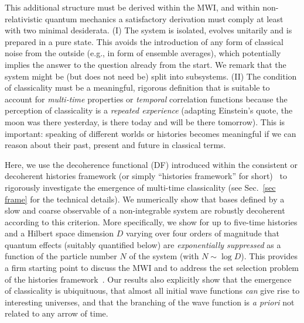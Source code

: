 \documentclass[pre,onecolumn,12pt,aps,longbibliography,nofootinbib]{revtex4-2}
\newcommand{\blue}[1]{#1}
\newcommand{\new}[1]{#1}
\begin{document}
This additional structure must be derived \new{within the MWI}, and within non-relativistic quantum mechanics a satisfactory derivation must comply at least with two minimal desiderata. (I) The system is isolated, evolves unitarily and is prepared in a pure state. This avoids the introduction of any form of classical noise from the outside (e.g., in form of ensemble averages), which potentially implies the answer to the question already from the start. We remark that the system might be (but does not need be) split into subsystems. (II) The condition of classicality must be a meaningful, rigorous definition that is suitable to account for \emph{multi-time} properties or \emph{temporal} correlation functions because the perception of classicality is a \emph{repeated experience} (adapting Einstein's quote, the moon was there yesterday, is there today and will be there tomorrow). This is important: speaking of different worlds or histories becomes meaningful if we can reason about their past, present and future in classical terms.

Here, we use the decoherence functional (DF) introduced within the consistent or decoherent histories framework (or simply ``histories framework'' for short)~\cite{GriffithsJSP1984, GellMannHartleInBook1990, OmnesRMP1992, DowkerHalliwellPRD1992, GellMannHartlePRD1993, HalliwellANY1995, DowkerKentJSP1996, GriffithsBook2002, GellMannHartlePRA2007, Griffiths2019} \new{to} rigorous\new{ly investigate the emergence} of multi-time classicality (see Sec.~\ref{sec frame} for the technical details). We numerically show that bases defined by a slow and coarse observable of a non-integrable system \new{are robustly decoherent according to this criterion}. More specifically, we show for up to five-time histories and a Hilbert space dimension $D$ varying over four orders of magnitude that quantum effects (suitably quantified below) are \emph{exponentially suppressed} as a function of the particle number $N$ of the system (with $N\sim\log D$). This provides a firm starting point to discuss the MWI \new{and to address the set selection problem of the histories framework~\cite{PazZurekPRD1993, DowkerKentPRL1995, DowkerKentJSP1996, RiedelZurekZwolakPRA2016}.} \blue{Our results also explicitly show} that the emergence of classicality is ubiquituous, that almost all initial wave functions \new{\emph{can}} give rise to interesting universes, and that the branching of the wave function is \emph{a priori} not related to any arrow of time.
\end{document}
